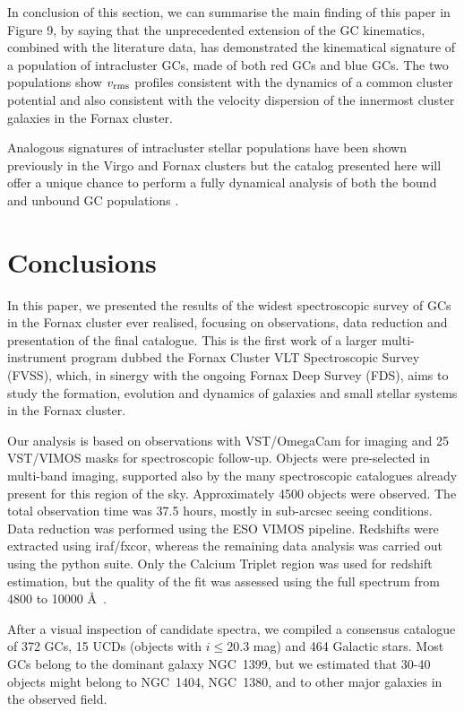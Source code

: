 \documentclass[useAMS,usenatbib]{mn2e}
\begin{document}
In conclusion of this section, we can summarise the main finding of this paper 
in Figure 9, by saying that the unprecedented extension of the GC kinematics, 
combined with the literature data, has demonstrated the kinematical signature 
of a population of intracluster GCs, made of both red GCs and blue GCs. The two 
populations show $v_{\rm rms}$ profiles consistent with the dynamics of a 
common cluster potential and also consistent with the velocity dispersion of 
the innermost cluster galaxies in the Fornax cluster. 

Analogous signatures of intracluster stellar populations have been shown 
previously in the Virgo and Fornax clusters \citep[see e.g., ][]{Arnaboldi04, 
Longobardi15, Paolillo02} but the catalog presented here will offer a unique 
chance to perform a fully dynamical analysis of both the bound and unbound GC 
populations \citep{DAbrusco16}.

\section{Conclusions}
\label{sec:conclusions}
In this paper, we presented the results of the widest spectroscopic survey of 
GCs in the Fornax cluster ever realised, focusing on observations, data 
reduction and presentation of the final catalogue. This is the first work of a 
larger multi-instrument program dubbed the Fornax Cluster VLT Spectroscopic 
Survey (FVSS), which, in sinergy with the ongoing Fornax Deep Survey (FDS), 
aims to study the formation, evolution and dynamics of galaxies and small 
stellar systems in the Fornax cluster.

Our analysis is based on observations with VST/OmegaCam for imaging and 25 
VST/VIMOS masks for spectroscopic follow-up. Objects were pre-selected in 
multi-band imaging, supported also by the many spectroscopic catalogues already 
present for this region of the sky.  Approximately 4500 objects were observed. 
The total observation time was 37.5 hours, mostly in sub-arcsec seeing 
conditions. Data reduction was performed using the ESO VIMOS pipeline. 
Redshifts were extracted using iraf/fxcor, whereas the remaining data analysis 
was carried out using the python suite. Only the Calcium Triplet region was 
used for redshift estimation, but the quality of the fit was assessed using the 
full spectrum from 4800 to 10000 \AA\ .

After a visual inspection of candidate spectra, we compiled a consensus 
catalogue of 372 GCs, 15 UCDs (objects with $i \le 20.3$ mag) and 464 Galactic 
stars. Most GCs belong to the dominant galaxy NGC~1399, but we estimated that 
30-40 objects might belong to NGC~1404, NGC~1380, and to other major galaxies 
in the observed field.
\end{document}
